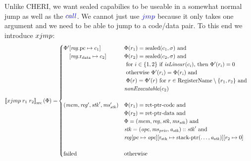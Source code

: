 \documentclass[a4paper]{article}
\newcommand{\sem}[1]{\left\llbracket #1 \right\rrbracket}
\newcommand{\ssem}[2][\Phi]{\sem{#2}_{\mathrm{src}}(#1)}
\newcommand{\sourcecolor}[1]{\color{blue}}
\newcommand{\src}[1]{{\sourcecolor{} #1}}
\newcommand{\targetcolor}[1]{\color{black}}
\newcommand{\trg}[1]{{\targetcolor{} #1}}
\newcommand{\zinstr}[1]{#1}
\newcommand{\oneinstr}[2]{
  \ifthenelse{\equal{#2}{}}
  {\zinstr{#1}}
  {\zinstr{#1} \; #2}
}
\newcommand{\twoinstr}[3]{
  \ifthenelse{\equal{#2#3}{}}
  {\zinstr{#1}}
  {\zinstr{#1} \; #2 \; #3}
}
\newcommand{\sjmp}[1]{\oneinstr{\src{jmp}}{#1}}
\newcommand{\scall}[2]{\twoinstr{\src{call}}{#1}{#2}}
\newcommand{\sxjmp}[2]{\twoinstr{\trg{xjmp}}{#1}{#2}}
\newcommand{\update}[2]{[#1 \mapsto #2]}
\newcommand{\shareddom}[1]{\mathrm{#1}}
\newcommand{\stkptr}[1]{\mathrm{stack\text{-}ptr}(#1)}
\newcommand{\retptrd}{\mathrm{ret\text{-}ptr\text{-}data}}
\newcommand{\retptrc}{\mathrm{ret\text{-}ptr\text{-}code}}
\newcommand{\sealed}[1]{\shareddom{sealed}(#1)}
\newcommand{\failed}{\mathrm{failed}}
\newcommand{\targetdom}[1]{\mathrm{#1}}
\newcommand{\tRegName}{\targetdom{RegisterName}}
\newcommand{\var}[1]{\mathit{#1}}
\newcommand{\reg}{\var{reg}}
\newcommand{\mem}{\var{mem}}
\newcommand{\ms}{\var{ms}}
\newcommand{\stk}{\var{stk}}
\newcommand{\priv}{\var{priv}}
\newcommand{\opc}{\var{opc}}
\newcommand{\aaddr}{\var{a}}
\newcommand{\pcreg}{\mathrm{pc}}
\newcommand{\rstk}{\mathrm{r}_\mathrm{stk}}
\newcommand{\rdata}{\mathrm{r}_\mathrm{data}}
\newcommand{\plainfun}[2]{
  \ifthenelse{\equal{#2}{}}
  {\mathit{#1}}
  {\mathit{#1}(#2)}
}
\newcommand{\nonExec}[1]{\plainfun{nonExecutable}{#1}}
\newcommand{\isLinear}[1]{\plainfun{isLinear}{#1}}
\begin{document}
Unlike CHERI, we want sealed capabilies to be useable in a somewhat normal jump as well as the $\scall{}{}$. We cannot just use $\sjmp{}$ because it only takes one argument and we need to be able to jump to a code/data pair. To this end we introduce $\sxjmp{}{}$:
\begin{align*}
  \ssem{\sxjmp{r_1}{r_2}} = & 
                              \begin{cases}
                                \Phi'
                                \arraycolsep=0pt
                                \begin{array}[t]{l}
                                  [\reg.\pcreg \mapsto c_1] \\
                                  [\reg.\rdata \mapsto c_2]
                                \end{array} & 
                                \arraycolsep=0pt
                                \begin{array}[t]{l}
                                  \Phi(r_1) = \sealed{c_1,\sigma} \text{ and } \\
                                  \Phi(r_2) = \sealed{c_2,\sigma} \text{ and } \\
                                  \text{ for $i \in \{1,2\}$ if $\isLinear{c_i}$, then $\Phi'(r_i) = 0$} \\
                                  \text{ otherwise $\Phi'(r_i) = \Phi(r_i)$ and} \\
                                  \text{ $ \Phi(r) = \Phi'(r) \text{ for } r\in \tRegName \setminus \{r_1,r_2\}$ and} \\
                                  \nonExec{c_2}
                                \end{array}\\\\
%
                                (\mem,\reg',\stk',\ms_\stk') &
                                \arraycolsep=0pt
                                \begin{array}[t]{l}
                                  \Phi(r_1) = \retptrc \text{ and } \\
                                  \Phi(r_2) = \retptrd \text{ and } \\
                                  \Phi = (\mem, \reg, \stk, \ms_\stk) \text{ and } \\
                                  \stk = (\opc,\ms_\priv,\aaddr_\stk) :: \stk' \text{ and } \\
                                  \reg \arraycolsep=0pt
                                  \begin{array}[t]{l}
                                    \update{\pcreg}{\opc}\update{\rstk}{\stkptr{\dots,\aaddr_\stk}}\update{r_2}{0}\\
                                  \end{array}
                                \end{array}\\\\
%
                                \failed & \text{otherwise}
                              \end{cases}
\end{align*}
\end{document}
